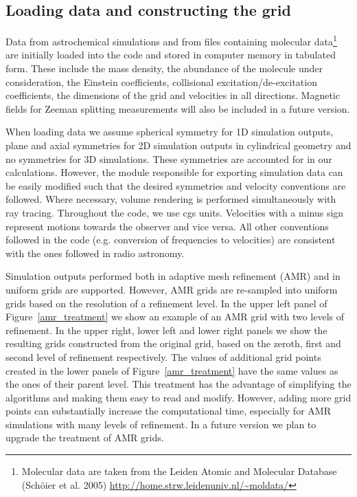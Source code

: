 \documentclass{mn2e}
\begin{document}
\subsection{Loading data and constructing the grid}

Data from astrochemical simulations and from files containing molecular data\footnote{Molecular data are taken from the Leiden Atomic and Molecular Database (Sch{\"o}ier et al. 2005) \url{http://home.strw.leidenuniv.nl/~moldata/}} are initially loaded into the code and stored in computer memory in tabulated form. These include the mass density, the abundance of the molecule under consideration, the Einstein coefficients, collisional excitation/de-excitation coefficients, the dimensions of the grid and velocities in all directions. Magnetic fields for Zeeman splitting measurements will also be included in a future version. 

When loading data we assume spherical symmetry for 1D simulation outputs, plane and axial symmetries for 2D simulation outputs in cylindrical geometry and no symmetries for 3D simulations. These symmetries are accounted for in our calculations. However, the module responsible for exporting simulation data can be easily modified such that the desired symmetries and velocity conventions are followed. Where necessary, volume rendering is performed simultaneously with ray tracing. Throughout the code, we use cgs units. Velocities with a minus sign represent motions towards the observer and vice versa. All other conventions followed in the code (e.g. conversion of frequencies to velocities) are consistent with the ones followed in radio astronomy. 

Simulation outputs performed both in adaptive mesh refinement (AMR) and in uniform grids are supported. However, AMR grids are re-sampled into uniform grids based on the resolution of a refinement level. In the upper left panel of Figure~\ref{amr_treatment} we show an example of an AMR grid with two levels of refinement. In the upper right, lower left and lower right panels we show the resulting grids constructed from the original grid, based on the zeroth, first and second level of refinement respectively. The values of additional grid points created in the lower panels of Figure~\ref{amr_treatment} have the same values as the ones of their parent level. This treatment has the advantage of simplifying the algorithms and making them easy to read and modify. However, adding more grid points can substantially increase the computational time, especially for AMR simulations with many levels of refinement. In a future version we plan to upgrade the treatment of AMR grids.
\end{document}
